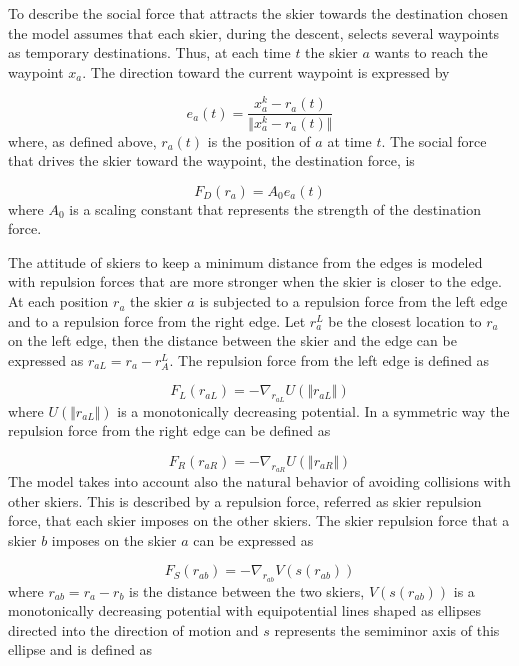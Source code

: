 \documentclass[12pt,a4paper,twoside]{book}
\begin{document}
To describe the social force that attracts the skier towards the destination chosen the model assumes that each skier, during the descent, selects several waypoints as temporary destinations. Thus, at each time $t$ the skier $a$ wants to reach the waypoint $x_a$. The direction toward the current waypoint is expressed by

\begin{equation}\label{waypoint_direction}
e_a(t)=\frac{x^k_a-r_a(t)}{\Vert x^k_a-r_a(t) \Vert}
\end{equation}
where, as defined above, $r_a(t)$ is the position of $a$ at time $t$. The social force that drives the skier toward the waypoint, the destination force, is

\begin{equation}\label{destination_force}
F_D(r_a)=A_0 e_a(t)
\end{equation}
where $A_0$ is a scaling constant that represents the strength of the destination force.

The attitude of skiers to keep a minimum distance from the edges is modeled with repulsion forces that are more stronger when the skier is closer to the edge. At each position $r_a$ the skier $a$ is subjected to a repulsion force from the left edge and to a repulsion force from the right edge. Let $r_a^L$ be the closest location to $r_a$ on the left edge, then the distance between the skier and the edge can be expressed as $r_{aL}=r_a-r_A^L$. The repulsion force from the left edge is defined as

\begin{equation}\label{left_force}
F_L(r_{aL})=-\nabla_{r_{aL}}U(\Vert r_{aL} \Vert )
\end{equation}
where $U(\Vert r_{aL} \Vert )$ is a monotonically decreasing potential. In a symmetric way the repulsion force from the right edge can be defined as

\begin{equation}\label{right_force}
F_R(r_{aR})=-\nabla_{r_{aR}}U(\Vert r_{aR} \Vert )
\end{equation}
The model takes into account also the natural behavior of avoiding collisions with other skiers. This is described by a repulsion force, referred as skier repulsion force, that each skier imposes on the other skiers. The skier repulsion force that a skier $b$ imposes on the skier $a$ can be expressed as

\begin{equation}\label{skier_force}
F_S(r_{ab})=-\nabla_{r_{ab}}V(s(r_{ab}))
\end{equation}
where $r_{ab}=r_a-r_b$ is the distance between the two skiers, $V(s(r_{ab}))$ is a monotonically decreasing potential with equipotential lines shaped as ellipses directed into the direction of motion and $s$ represents the semiminor axis of this ellipse and is defined as
\end{document}
